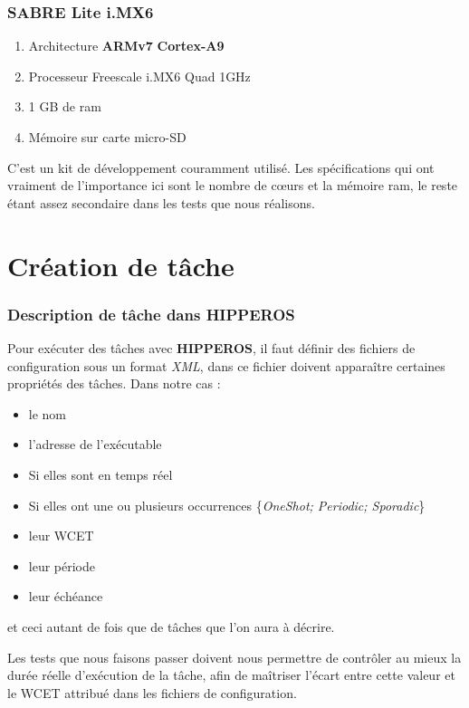 	\subsubsection{SABRE Lite i.MX6}
		\begin{enumerate}
			\setlength\itemsep{0.1em}
			\item Architecture \textbf{ARMv7} \textbf{Cortex-A9}
			\item Processeur Freescale i.MX6 Quad 1GHz
			\item 1 GB de ram
			\item Mémoire sur carte micro-SD
		\end{enumerate}
	C'est un kit de développement couramment utilisé. Les spécifications qui 
	ont vraiment de l'importance ici sont le nombre de cœurs et la mémoire ram, 
	le reste étant assez secondaire dans les tests que nous réalisons.

\section{Création de tâche}

	\subsubsection{Description de tâche dans HIPPEROS}
	Pour exécuter des tâches avec \textbf{HIPPEROS}, il faut définir des fichiers de configuration 
	sous un format \textit{XML}, dans ce fichier doivent apparaître certaines propriétés des tâches. 
	Dans notre cas :
	\begin{itemize}
		\setlength\itemsep{0.1em}
		\item le nom
		\item l'adresse de l'exécutable
		\item Si elles sont en temps réel
		\item Si elles ont une ou plusieurs occurrences \{\textit{OneShot; Periodic; Sporadic}\}
		\item leur WCET
		\item leur période
		\item leur échéance
	\end{itemize}
	et ceci autant de fois que de tâches que l'on aura à décrire. \newline
	
	Les tests que nous faisons passer doivent nous permettre de contrôler au mieux la durée réelle 
	d'exécution de la tâche, afin de maîtriser l'écart entre cette valeur et le WCET attribué dans les 
	fichiers de configuration. \newline
	
